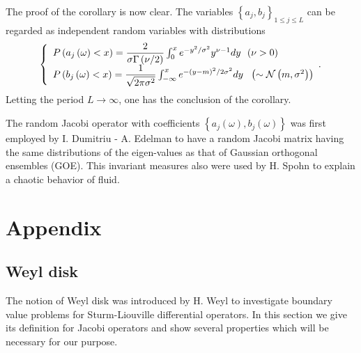 \documentclass[a4paper]{article}%
\begin{document}
The proof of the corollary is now clear. The variables $\left\{  a_{j}%
,b_{j}\right\}  _{1\leq j\leq L}$ can be regarded as independent random
variables with distributions%
\[
\left\{
\begin{array}
[c]{l}%
P\left(  a_{j}\left(  \omega\right)  <x\right)  =\dfrac{2}{\sigma\Gamma\left(
\nu/2\right)  }\int_{0}^{x}e^{-y^{2}/\sigma^{2}}y^{\nu-1}dy\text{ \ (}%
\nu>0\text{)}\\
P\left(  b_{j}\left(  \omega\right)  <x\right)  =\dfrac{1}{\sqrt{2\pi
\sigma^{2}}}\int_{-\infty}^{x}e^{-\left(  y-m\right)  ^{2}/2\sigma^{2}%
}dy\text{ \ }\left(  \sim\mathcal{N}\left(  m,\sigma^{2}\right)  \right)
\end{array}
\text{.}\right.
\]
Letting the period $L\rightarrow\infty$, one has the conclusion of the corollary.

The random Jacobi operator with coefficients $\left\{  a_{j}\left(
\omega\right)  ,b_{j}\left(  \omega\right)  \right\}  $ was first employed by
I. Dumitriu - A. Edelman \cite{d} to have a random Jacobi matrix having the
same distributions of the eigen-values as that of Gaussian orthogonal
ensembles (GOE). This invariant measures also were used by H. Spohn \cite{sp}
to explain a chaotic behavior of fluid.

\section{Appendix}

\subsection{Weyl disk}

The notion of Weyl disk was introduced by H. Weyl to investigate boundary
value problems for Sturm-Liouville differential operators. In this section we
give its definition for Jacobi operators and show several properties which
will be necessary for our purpose.
\end{document}
